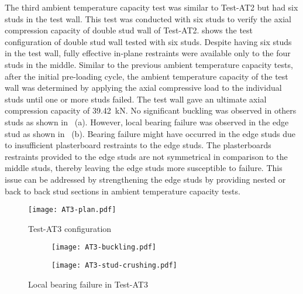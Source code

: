 The third ambient temperature capacity test was similar to Test-AT2 but had six studs in the test wall. This test was conducted with six studs to verify the axial compression capacity of double stud wall of Test-AT2.  shows the test configuration of double stud wall tested with six studs. Despite having six studs in the test wall, fully effective in-plane restraints were available only to the four studs in the middle. Similar to the previous ambient temperature capacity tests, after the initial pre-loading cycle, the ambient temperature capacity of the test wall was determined by applying the axial compressive load to the individual studs until one or more studs failed. The test wall gave an ultimate axial compression capacity of 39.42~kN. No significant buckling was observed in others studs as shown in ~(a). However, local bearing failure was observed in the edge stud as shown in ~(b). Bearing failure might have occurred in the edge studs due to insufficient plasterboard restraints to the edge studs. The plasterboards restraints provided to the edge studs are not symmetrical in comparison to the middle studs, thereby leaving the edge studs more susceptible to failure. This issue can be addressed by strengthening the edge studs by providing nested or back to back stud sections in ambient temperature capacity tests. 
\begin{figure}[!htbp]
	\centering
			\texttt{[image: AT3-plan.pdf]}\\
		\caption{Test-AT3 configuration}
		\label{fig:AT3-plan}
\end{figure} 
\begin{figure}[!htbp]
	\centering
	\begin{subfigure}[b]{0.5\textwidth}
		\centering
		\texttt{[image: AT3-buckling.pdf]}
		\caption{}
		\label{subfig:AT3-stud-buckling}
	\end{subfigure}
	\begin{subfigure}[b]{0.24\textwidth}
		\centering
		\texttt{[image: AT3-stud-crushing.pdf]}
		\caption{}
		\label{subfig:AT3-stud-crushing}
	\end{subfigure}
	   \caption{Local bearing failure in Test-AT3}
	   \label{fig:AT3-buckling}
\end{figure} 

